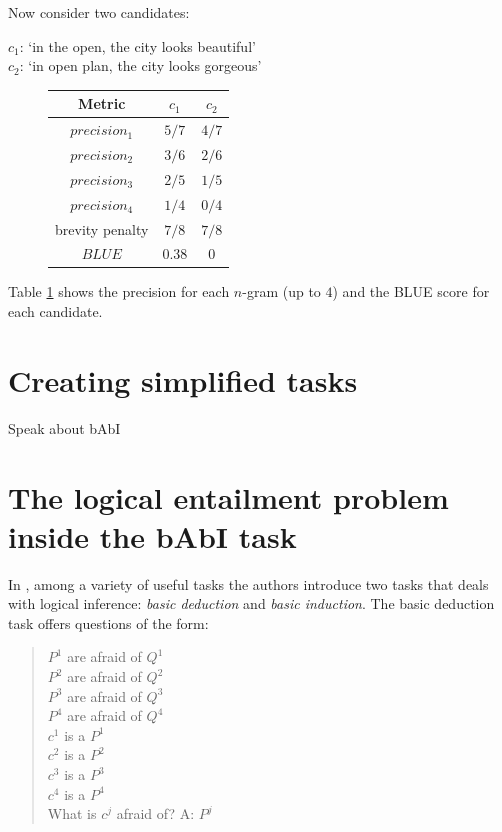 Now consider two candidates:

\begin{center}
$c_1$: `in the open, the city looks beautiful'\\
$c_2$: `in open plan, the city looks gorgeous'\\
\end{center}

\begin{figure}
\label{bluetable}
\begin{center}
\begin{tabular}{|c|c|c|}
\hline
\cellcolor{blue!10} Metric& \cellcolor{blue!10} $c_1$ & \cellcolor{blue!10} $c_2$ \\ \hline
\cellcolor{blue!10} $precision_1$& $5/7$ & $4/7$ \\ \hline
\cellcolor{blue!10} $precision_2$& $3/6$ & $2/6$  \\ \hline
\cellcolor{blue!10} $precision_3$& $2/5$ & $1/5$  \\ \hline
\cellcolor{blue!10} $precision_4$& $1/4$ & $0/4$  \\ \hline
\cellcolor{blue!10} brevity penalty& $7/8$ & $7/8$  \\ \hline
\cellcolor{blue!10} $BLUE$& $0.38$ & $0$ \\ \hline
\end{tabular}
\end{center}
\end{figure}


Table \ref{bluetable} shows the precision for each $n$-gram (up to $4$) and the BLUE score for each candidate.

\section{Creating simplified tasks}
\label{ch:03-tasks}

Speak about bAbI


\section{The logical entailment problem inside the bAbI task}
\label{ch:03-tasks}


In \cite{WestonBCM15}, among a variety of useful tasks the authors introduce two tasks that deals with logical inference: \textit{basic deduction} and \textit{basic induction}. The basic deduction task offers questions of the form:

\begin{quote} 
\centering 
$P^{1}$ are afraid of $Q^{1}$\\
$P^{2}$ are afraid of $Q^{2}$\\
$P^{3}$ are afraid of $Q^{3}$\\
$P^{4}$ are afraid of $Q^{4}$\\
$c^{1}$ is a $P^{1}$\\
$c^{2}$ is a $P^{2}$\\
$c^{3}$ is a $P^{3}$\\
$c^{4}$ is a $P^{4}$\\
What is $c^j$ afraid of? A: $P^{j}$\\
\end{quote}

